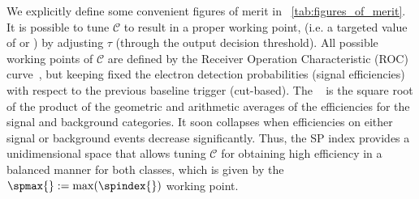 We explicitly define some convenient figures of merit in \tablename~\ref{tab:figures_of_merit}. It is possible to tune $\mathcal{C}$ to result in a proper working point, (i.e. a targeted value of \pd{} or \pf{}) by adjusting $\tau$ (through the output decision threshold). All possible working points of $\mathcal{C}$ are defined by the Receiver Operation Characteristic (ROC) curve~\cite{van_trees_part1}, but keeping fixed the electron detection probabilities (signal efficiencies) with respect to the previous baseline trigger (cut-based). The \spindex{}~\cite{dos2006neural} is the square root of the product of the geometric and arithmetic averages of the efficiencies for the signal and background categories. It soon collapses when efficiencies on either signal or background events decrease significantly. Thus, the SP index provides a unidimensional space that allows tuning $\mathcal{C}$ for obtaining high efficiency in a balanced manner for both classes, which is given by the $\spmax{}:=\max(\spindex{})$ working point.













